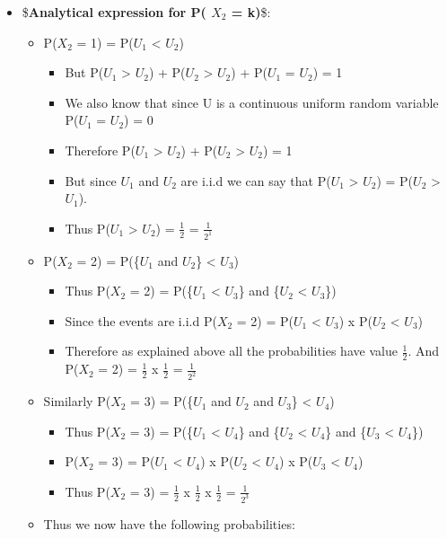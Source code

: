 \documentclass[11pt]{article}
\begin{document}
    \begin{itemize}
\item
  \$\textbf{Analytical expression for P( $X_2$ = k)}\$:

  \begin{itemize}
  \item
    P(\(X_2\) = 1) = P(\(U_1\) \textless{} \(U_2\))

    \begin{itemize}
    \item
      But P(\(U_1\) \textgreater{} \(U_2\)) + P(\(U_2\) \textgreater{}
      \(U_2\)) + P(\(U_1\) = \(U_2\)) = 1
    \item
      We also know that since U is a continuous uniform random variable
      P(\(U_1\) = \(U_2\)) = 0
    \item
      Therefore P(\(U_1\) \textgreater{} \(U_2\)) + P(\(U_2\)
      \textgreater{} \(U_2\)) = 1
    \item
      But since \(U_1\) and \(U_2\) are i.i.d we can say that P(\(U_1\)
      \textgreater{} \(U_2\)) = P(\(U_2\) \textgreater{} \(U_1\)).
    \item
      Thus P(\(U_1\) \textgreater{} \(U_2\)) = \(\frac{1}{2}\) =
      \(\frac{1}{2^1}\)
    \end{itemize}
  \item
    P(\(X_2\) = 2) = P(\{\(U_1\) and \(U_2\)\} \textless{} \(U_3\))

    \begin{itemize}
    \item
      Thus P(\(X_2\) = 2) = P(\{\(U_1\) \textless{} \(U_3\)\} and
      \{\(U_2\) \textless{} \(U_3\)\})
    \item
      Since the events are i.i.d P(\(X_2\) = 2) = P(\(U_1\) \textless{}
      \(U_3\)) x P(\(U_2\) \textless{} \(U_3\))
    \item
      Therefore as explained above all the probabilities have value
      \(\frac{1}{2}\). And P(\(X_2\) = 2) = \(\frac{1}{2}\) x
      \(\frac{1}{2}\) = \(\frac{1}{2^2}\)
    \end{itemize}
  \item
    Similarly P(\(X_2\) = 3) = P(\{\(U_1\) and \(U_2\) and \(U_3\)\}
    \textless{} \(U_4\))

    \begin{itemize}
    \item
      Thus P(\(X_2\) = 3) = P(\{\(U_1\) \textless{} \(U_4\)\} and
      \{\(U_2\) \textless{} \(U_4\)\} and \{\(U_3\) \textless{}
      \(U_4\)\})
    \item
      P(\(X_2\) = 3) = P(\(U_1\) \textless{} \(U_4\)) x P(\(U_2\)
      \textless{} \(U_4\)) x P(\(U_3\) \textless{} \(U_4\))
    \item
      Thus P(\(X_2\) = 3) = \(\frac{1}{2}\) x \(\frac{1}{2}\) x
      \(\frac{1}{2}\) = \(\frac{1}{2^3}\)
    \end{itemize}
  \item
    Thus we now have the following probabilities:


\end{itemize}
\end{itemize}
\end{document}
